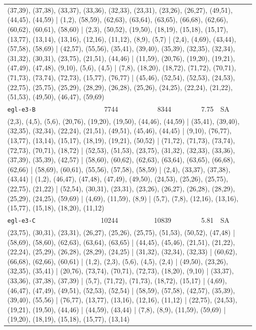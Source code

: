 \begin{longtable}{lrrrl}
\multicolumn{5}{p{0.96\linewidth}}{\tiny\raggedright\arraybackslash (37,39), (37,38), (33,37), (33,36), (32,33), (23,31), (23,26), (26,27), (49,51), (44,45), (44,59) | (1,2), (58,59), (62,63), (63,64), (63,65), (66,68), (62,66), (60,62), (60,61), (58,60) | (2,3), (50,52), (19,50), (18,19), (15,18), (15,17), (13,77), (13,14), (13,16), (12,16), (11,12), (8,9), (5,7) | (2,4), (4,69), (43,44), (57,58), (58,69) | (42,57), (55,56), (35,41), (39,40), (35,39), (32,35), (32,34), (31,32), (30,31), (23,75), (21,51), (44,46) | (11,59), (20,76), (19,20), (19,21), (47,49), (47,48), (9,10), (5,6), (4,5) | (7,8), (18,20), (18,72), (71,72), (70,71), (71,73), (73,74), (72,73), (15,77), (76,77) | (45,46), (52,54), (52,53), (24,53), (22,75), (25,75), (25,29), (28,29), (26,28), (25,26), (24,25), (22,24), (21,22), (51,53), (49,50), (46,47), (59,69)} \\[2pt]
\texttt{egl-e3-B} & 7744 & 8344 & 7.75 & SA \\
\multicolumn{5}{p{0.96\linewidth}}{\tiny\raggedright\arraybackslash (2,3), (4,5), (5,6), (20,76), (19,20), (19,50), (44,46), (44,59) | (35,41), (39,40), (32,35), (32,34), (22,24), (21,51), (49,51), (45,46), (44,45) | (9,10), (76,77), (13,77), (13,14), (15,17), (18,19), (19,21), (50,52) | (71,72), (71,73), (73,74), (72,73), (70,71), (18,72) | (52,53), (51,53), (23,75), (31,32), (32,33), (33,36), (37,39), (35,39), (42,57) | (58,60), (60,62), (62,63), (63,64), (63,65), (66,68), (62,66) | (58,69), (60,61), (55,56), (57,58), (58,59) | (2,4), (33,37), (37,38), (43,44) | (1,2), (46,47), (47,48), (47,49), (49,50), (24,53), (25,26), (25,75), (22,75), (21,22) | (52,54), (30,31), (23,31), (23,26), (26,27), (26,28), (28,29), (25,29), (24,25), (59,69) | (4,69), (11,59), (8,9) | (5,7), (7,8), (12,16), (13,16), (15,77), (15,18), (18,20), (11,12)} \\[2pt]
\texttt{egl-e3-C} & 10244 & 10839 & 5.81 & SA \\
\multicolumn{5}{p{0.96\linewidth}}{\tiny\raggedright\arraybackslash (23,75), (30,31), (23,31), (26,27), (25,26), (25,75), (51,53), (50,52), (47,48) | (58,69), (58,60), (62,63), (63,64), (63,65) | (44,45), (45,46), (21,51), (21,22), (22,24), (25,29), (26,28), (28,29), (24,25) | (31,32), (32,34), (32,33) | (60,62), (66,68), (62,66), (60,61) | (1,2), (2,3), (5,6), (4,5), (2,4) | (49,50), (23,26), (32,35), (35,41) | (20,76), (73,74), (70,71), (72,73), (18,20), (9,10) | (33,37), (33,36), (37,38), (37,39) | (5,7), (71,72), (71,73), (18,72), (15,17) | (4,69), (46,47), (47,49), (49,51), (52,53), (52,54) | (58,59), (57,58), (42,57), (35,39), (39,40), (55,56) | (76,77), (13,77), (13,16), (12,16), (11,12) | (22,75), (24,53), (19,21), (19,50), (44,46) | (44,59), (43,44) | (7,8), (8,9), (11,59), (59,69) | (19,20), (18,19), (15,18), (15,77), (13,14)} \\[2pt]

\end{longtable}
